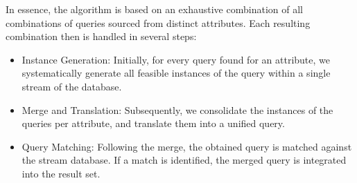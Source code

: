 In essence, the algorithm is based on an exhaustive combination of all
combinations of queries sourced from distinct attributes. Each resulting
combination then is handled in several steps:
\begin{itemize}
\item Instance Generation: Initially, for every query found for an
attribute, we systematically
generate all
feasible instances of the query within a single stream of the database.
\item Merge and Translation: Subsequently, we consolidate the instances of
the queries per attribute, and translate them into a unified query.
\item Query Matching: Following the merge, the obtained query is matched
against the stream database. If a match is identified, the merged query is
integrated into the result set.
\end{itemize}

